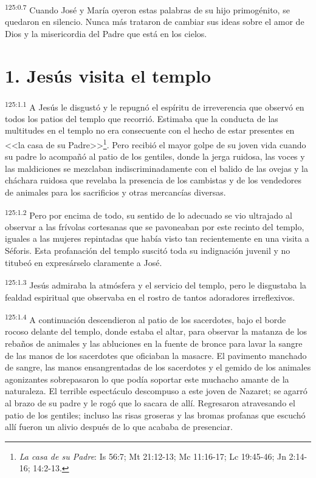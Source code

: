 \par 
\textsuperscript{125:0.7} Cuando José y María oyeron estas palabras de su hijo primogénito, se quedaron en silencio. Nunca más trataron de cambiar sus ideas sobre el amor de Dios y la misericordia del Padre que está en los cielos.

\section*{1. Jesús visita el templo}
\par 
\textsuperscript{125:1.1} A Jesús le disgustó y le repugnó el espíritu de irreverencia que observó en todos los patios del templo que recorrió. Estimaba que la conducta de las multitudes en el templo no era consecuente con el hecho de estar presentes en <<la casa de su Padre>>\footnote{\textit{La casa de su Padre}: Is 56:7; Mt 21:12-13; Mc 11:16-17; Lc 19:45-46; Jn 2:14-16; 14:2-13.}. Pero recibió el mayor golpe de su joven vida cuando su padre lo acompañó al patio de los gentiles, donde la jerga ruidosa, las voces y las maldiciones se mezclaban indiscriminadamente con el balido de las ovejas y la cháchara ruidosa que revelaba la presencia de los cambistas y de los vendedores de animales para los sacrificios y otras mercancías diversas.

\par 
\textsuperscript{125:1.2} Pero por encima de todo, su sentido de lo adecuado se vio ultrajado al observar a las frívolas cortesanas que se pavoneaban por este recinto del templo, iguales a las mujeres repintadas que había visto tan recientemente en una visita a Séforis. Esta profanación del templo suscitó toda su indignación juvenil y no titubeó en expresárselo claramente a José.

\par 
\textsuperscript{125:1.3} Jesús admiraba la atmósfera y el servicio del templo, pero le disgustaba la fealdad espiritual que observaba en el rostro de tantos adoradores irreflexivos.

\par 
\textsuperscript{125:1.4} A continuación descendieron al patio de los sacerdotes, bajo el borde rocoso delante del templo, donde estaba el altar, para observar la matanza de los rebaños de animales y las abluciones en la fuente de bronce para lavar la sangre de las manos de los sacerdotes que oficiaban la masacre. El pavimento manchado de sangre, las manos ensangrentadas de los sacerdotes y el gemido de los animales agonizantes sobrepasaron lo que podía soportar este muchacho amante de la naturaleza. El terrible espectáculo descompuso a este joven de Nazaret; se agarró al brazo de su padre y le rogó que lo sacara de allí. Regresaron atravesando el patio de los gentiles; incluso las risas groseras y las bromas profanas que escuchó allí fueron un alivio después de lo que acababa de presenciar.

